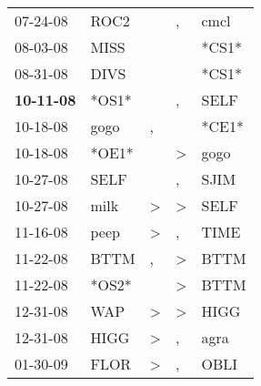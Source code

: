 \begin{supertabular}{p{0.07\textwidth}p{0.06\textwidth}p{0.02\textwidth}p{0.02\textwidth}p{0.06\textwidth}}
          07-24-08\textsuperscript{} &           ROC2\textsuperscript{} &                  &                , &           cmcl\textsuperscript{} \\
          08-03-08\textsuperscript{} &           MISS\textsuperscript{} &                  &                  &                            *CS1* \\
          08-31-08\textsuperscript{} &           DIVS\textsuperscript{} &                  &                  &                            *CS1* \\
 \textbf{10-11-08\textsuperscript{}} &                            *OS1* &                  &                , &           SELF\textsuperscript{} \\
          10-18-08\textsuperscript{} &           gogo\textsuperscript{} &                , &                  &                            *CE1* \\
          10-18-08\textsuperscript{} &                            *OE1* &                  &     \textgreater &           gogo\textsuperscript{} \\
          10-27-08\textsuperscript{} &           SELF\textsuperscript{} &                  &                , &           SJIM\textsuperscript{} \\
          10-27-08\textsuperscript{} &           milk\textsuperscript{} &     \textgreater &     \textgreater &           SELF\textsuperscript{} \\
          11-16-08\textsuperscript{} &           peep\textsuperscript{} &     \textgreater &                , &           TIME\textsuperscript{} \\
          11-22-08\textsuperscript{} &           BTTM\textsuperscript{} &                , &     \textgreater &           BTTM\textsuperscript{} \\
          11-22-08\textsuperscript{} &                            *OS2* &                  &     \textgreater &           BTTM\textsuperscript{} \\
          12-31-08\textsuperscript{} &            WAP\textsuperscript{} &     \textgreater &     \textgreater &           HIGG\textsuperscript{} \\
          12-31-08\textsuperscript{} &           HIGG\textsuperscript{} &     \textgreater &                , &           agra\textsuperscript{} \\
          01-30-09\textsuperscript{} &           FLOR\textsuperscript{} &     \textgreater &                , &           OBLI\textsuperscript{} \\

\end{supertabular}
